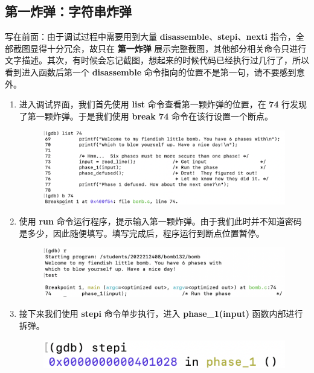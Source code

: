     \subsection{第一炸弹：字符串炸弹}
        \par 写在前面：由于调试过程中需要用到大量 \textbf{disassemble}、\textbf{stepi}、\textbf{nexti} 指令，全部截图显得十分冗余，故只在 \textbf{第一炸弹} 展示完整截图，其他部分相关命令只进行文字描述。其次，有时候会忘记截图，想起来的时候代码已经执行过几行了，所以看到进入函数后第一个 \textbf{disassemble} 命令指向的位置不是第一句，请不要感到意外。        \begin{enumerate}
            \item 进入调试界面，我们首先使用 \textbf{list} 命令查看第一颗炸弹的位置，在 \textbf{74} 行发现了第一颗炸弹。于是我们使用 \textbf{break 74} 命令在该行设置一个断点。
                \begin{figure}[htbp]
                    \centering
                    \includegraphics*[width = 12cm]{s1_0.png}
                \end{figure}
            \item 使用 \textbf{run} 命令运行程序，提示输入第一颗炸弹。由于我们此时并不知道密码是多少，因此随便填写。填写完成后，程序运行到断点位置暂停。
                \begin{figure}[htbp]
                    \centering
                    \includegraphics*[width = 12cm]{s1_1.png}
                \end{figure}
            \item 接下来我们使用 \textbf{stepi} 命令单步执行，进入 \textbf{phase\_1(input)} 函数内部进行拆弹。
                \begin{figure}[htbp]
                    \hspace*{1.5cm}
                    \includegraphics*[width = 12cm]{s1_3.png}

\end{figure}
\end{enumerate}
